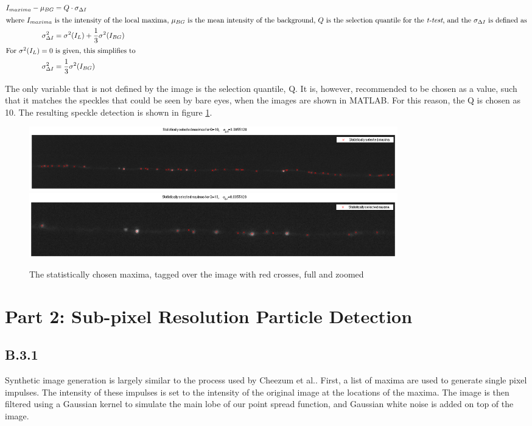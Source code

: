 \documentclass{article}
\begin{document}
\begin{align}
I_{maxima} - \mu_{BG} &= Q\cdot \sigma_{\Delta I}\\
\intertext{where $I_{maxima}$ is the intensity of the local maxima, $\mu_{BG}$ is the mean intensity of the background, $Q$ is the selection quantile for the \emph{t-test}, and the $\sigma_{\Delta I}$ is defined as}
\sigma^2_{\Delta I} &= \sigma^2(I_L) + \frac{1}{3}\sigma^2(I_{BG}) \nonumber \\
\intertext{For $\sigma^2(I_L)=0$ is given, this simplifies to}
\sigma^2_{\Delta I} &= \frac{1}{3}\sigma^2(I_{BG})
\end{align}

The only variable that is not defined by the image is the selection quantile, Q. It is, however, recommended to be chosen as a value, such that it matches the speckles that could be seen by bare eyes, when the images are shown in MATLAB. For this reason, the Q is chosen as 10. The resulting speckle detection is shown in figure \ref{fig:statMax}.

\begin{figure}[H]
\centering
\includegraphics[width=16cm]{figures/statistics_maxima_full.png}
\includegraphics[width=16cm]{figures/statistics_maxima_zoom.png}
\caption{The statistically chosen maxima, tagged over the image with red crosses,
    full and zoomed}
\label{fig:statMax}
\end{figure}
 


\pagebreak
\section*{Part 2: Sub-pixel Resolution Particle Detection}

\subsection*{B.3.1}

Synthetic image generation is largely similar to the process used by Cheezum et al.\cite{cheezum}. First, a list of maxima are used to generate single pixel impulses. The intensity of these impulses is set to the intensity of the original image at the locations of the maxima. The image is then filtered using a Gaussian kernel to simulate the main lobe of our point spread function, and Gaussian white noise is added on top of the image.
\end{document}

